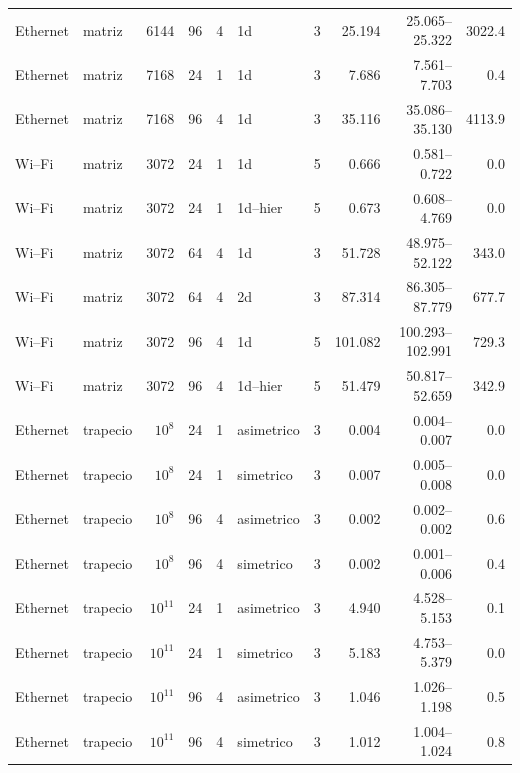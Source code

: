 \begin{longtable}{llrrrlrrrr}
Ethernet & matriz & 6144 & 96 & 4 & 1d & 3 & 25.194 & 25.065--25.322 & 3022.4 \\
Ethernet & matriz & 7168 & 24 & 1 & 1d & 3 & 7.686 & 7.561--7.703 & 0.4 \\
Ethernet & matriz & 7168 & 96 & 4 & 1d & 3 & 35.116 & 35.086--35.130 & 4113.9 \\
Wi--Fi & matriz & 3072 & 24 & 1 & 1d & 5 & 0.666 & 0.581--0.722 & 0.0 \\
Wi--Fi & matriz & 3072 & 24 & 1 & 1d--hier & 5 & 0.673 & 0.608--4.769 & 0.0 \\
Wi--Fi & matriz & 3072 & 64 & 4 & 1d & 3 & 51.728 & 48.975--52.122 & 343.0 \\
Wi--Fi & matriz & 3072 & 64 & 4 & 2d & 3 & 87.314 & 86.305--87.779 & 677.7 \\
Wi--Fi & matriz & 3072 & 96 & 4 & 1d & 5 & 101.082 & 100.293--102.991 & 729.3 \\
Wi--Fi & matriz & 3072 & 96 & 4 & 1d--hier & 5 & 51.479 & 50.817--52.659 & 342.9 \\
Ethernet & trapecio & $10^{8}$ & 24 & 1 & asimetrico & 3 & 0.004 & 0.004--0.007 & 0.0 \\
Ethernet & trapecio & $10^{8}$ & 24 & 1 & simetrico & 3 & 0.007 & 0.005--0.008 & 0.0 \\
Ethernet & trapecio & $10^{8}$ & 96 & 4 & asimetrico & 3 & 0.002 & 0.002--0.002 & 0.6 \\
Ethernet & trapecio & $10^{8}$ & 96 & 4 & simetrico & 3 & 0.002 & 0.001--0.006 & 0.4 \\
Ethernet & trapecio & $10^{11}$ & 24 & 1 & asimetrico & 3 & 4.940 & 4.528--5.153 & 0.1 \\
Ethernet & trapecio & $10^{11}$ & 24 & 1 & simetrico & 3 & 5.183 & 4.753--5.379 & 0.0 \\
Ethernet & trapecio & $10^{11}$ & 96 & 4 & asimetrico & 3 & 1.046 & 1.026--1.198 & 0.5 \\
Ethernet & trapecio & $10^{11}$ & 96 & 4 & simetrico & 3 & 1.012 & 1.004--1.024 & 0.8 \\
\bottomrule\end{longtable}
